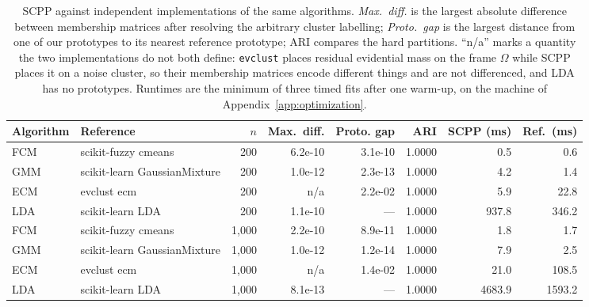 \begin{table}[t]
\centering
\small
\caption{SCPP against independent implementations of the same algorithms.
\emph{Max.\ diff.} is the largest absolute difference between membership
matrices after resolving the arbitrary cluster labelling; \emph{Proto.\ gap}
is the largest distance from one of our prototypes to its nearest reference
prototype; ARI compares the hard partitions. ``n/a'' marks a quantity the two
implementations do not both define: \texttt{evclust} places residual evidential
mass on the frame $\Omega$ while SCPP places it on a noise cluster, so their
membership matrices encode different things and are not differenced, and LDA
has no prototypes. Runtimes are the minimum of three timed fits after one
warm-up, on the machine of Appendix~\ref{app:optimization}.}
\label{tab:external-baselines}
\begin{tabular}{llrrrrrr}
\toprule
Algorithm & Reference & $n$ & Max.\ diff. & Proto. gap & ARI & SCPP (ms) & Ref.\ (ms) \\
\midrule
FCM & scikit-fuzzy cmeans & 200 & 6.2e-10 & 3.1e-10 & 1.0000 & 0.5 & 0.6 \\
GMM & scikit-learn GaussianMixture & 200 & 1.0e-12 & 2.3e-13 & 1.0000 & 4.2 & 1.4 \\
ECM & evclust ecm & 200 & n/a & 2.2e-02 & 1.0000 & 5.9 & 22.8 \\
LDA & scikit-learn LDA & 200 & 1.1e-10 & --- & 1.0000 & 937.8 & 346.2 \\
FCM & scikit-fuzzy cmeans & 1,000 & 2.2e-10 & 8.9e-11 & 1.0000 & 1.8 & 1.7 \\
GMM & scikit-learn GaussianMixture & 1,000 & 1.0e-12 & 1.2e-14 & 1.0000 & 7.9 & 2.5 \\
ECM & evclust ecm & 1,000 & n/a & 1.4e-02 & 1.0000 & 21.0 & 108.5 \\
LDA & scikit-learn LDA & 1,000 & 8.1e-13 & --- & 1.0000 & 4683.9 & 1593.2 \\
\bottomrule
\end{tabular}
\end{table}
